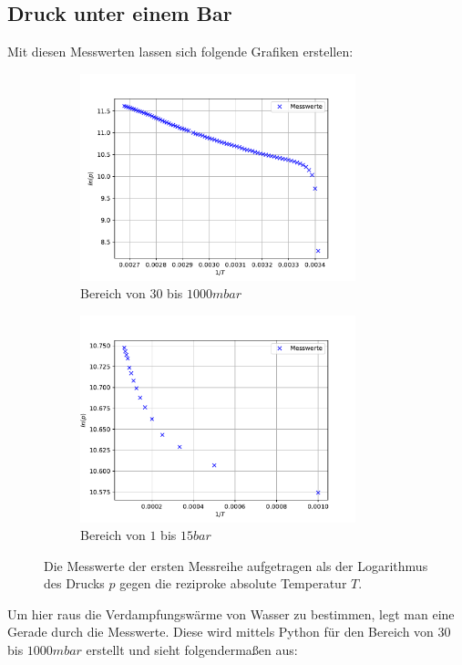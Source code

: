 \subsection{Druck unter einem Bar}
Mit diesen Messwerten lassen sich folgende Grafiken erstellen:
\begin{figure}[H]
  \begin{subfigure}{0.48\textwidth}
      \includegraphics[height=6cm]{python/plota.pdf}
    \caption{Bereich von $30$ bis $1000 mbar$}
    \label{fig:MesswerteKlein}
  \end{subfigure}
  \hfill
  \begin{subfigure}{0.48\textwidth}
    \includegraphics[height=6cm]{python/plotb.pdf}
    \caption{Bereich von $1$ bis $15 bar$}
    \label{fig:MesswerteGross}
  \end{subfigure}
  \caption{Die Messwerte der ersten Messreihe aufgetragen als der Logarithmus des Drucks $p$
  gegen die reziproke absolute Temperatur $T$.}
  \label{fig:Teila}
\end{figure}
Um hier raus die Verdampfungswärme von Wasser zu bestimmen, legt man eine Gerade durch die Messwerte.
Diese wird mittels Python für den Bereich von $30$ bis $1000 mbar$ erstellt und sieht folgendermaßen aus: \\
